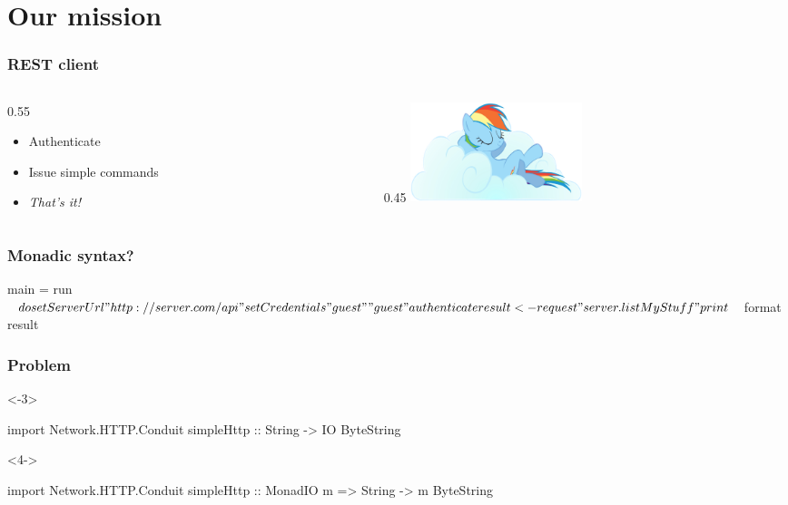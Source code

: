 \documentclass[20pt]{beamer}
\renewcommand{\(}[1]{\begin{columns}[#1]}
\renewcommand{\)}{\end{columns}}
\newcommand{\<}[1]{\begin{column}{#1\textwidth}}
\renewcommand{\>}{\end{column}}
\begin{document}

\section{Our mission}

\begin{frame}
  \frametitle{REST client}
  \({b}
  \<{0.55}
  \begin{itemize}
    \item Authenticate
    \item Issue simple commands
    \item \emph{That's it!}
  \end{itemize}
  \vspace{2cm}
  \>
  \<{0.45}
  \includegraphics[width=5cm]{img/rest}
  \>
  \)
\end{frame}

\begin{frame}[fragile]
  \frametitle{Monadic syntax?}
  \begin{code}
  main = run $ do
      setServerUrl   "http://server.com/api"
      setCredentials "guest" "guest"
      authenticate
      result <- request "server.listMyStuff"
      print $ format result
  \end{code}
\end{frame}

\begin{frame}[fragile]
  \frametitle{Problem}
  \begin{center}
    \begin{overlayarea}{\paperwidth}{2.4cm}
    \begin{onlyenv}<-3>
      \begin{code}
    import Network.HTTP.Conduit
    simpleHttp :: String -> IO ByteString
      \end{code}
      \vspace{0.8em}
    \end{onlyenv}
    \begin{onlyenv}<4->
      \begin{code}
    import Network.HTTP.Conduit
    simpleHttp :: MonadIO m =>
                  String -> m ByteString
      \end{code}
    \end{onlyenv}
    \end{overlayarea}
    ~\\
  \end{center}
\end{frame}
\end{document}
